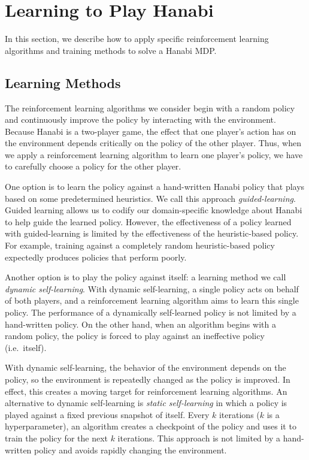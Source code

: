 \section{Learning to Play Hanabi}\label{sec:learninghanabi}

In this section, we describe how to apply specific reinforcement learning
algorithms and training methods to solve a Hanabi MDP.

\subsection{Learning Methods}
The reinforcement learning algorithms we consider begin with a random policy
and continuously improve the policy by interacting with the environment.
Because Hanabi is a two-player game, the effect that one player's action has on
the environment depends critically on the policy of the other player. Thus,
when we apply a reinforcement learning algorithm to learn one player's policy,
we have to carefully choose a policy for the other player.

One option is to learn the policy against a hand-written Hanabi policy that
plays based on some predetermined heuristics. We call this approach
\emph{guided-learning}. Guided learning allows us to codify our domain-specific
knowledge about Hanabi to help guide the learned policy. However, the
effectiveness of a policy learned with guided-learning is limited by the
effectiveness of the heuristic-based policy. For example, training against a
completely random heuristic-based policy expectedly produces policies that
perform poorly.

Another option is to play the policy against itself: a learning method we call
\emph{dynamic self-learning}. With dynamic self-learning, a single policy acts
on behalf of both players, and a reinforcement learning algorithm aims to
learn this single policy. The performance of a dynamically self-learned
policy is not limited by a hand-written policy. On the other hand, when an
algorithm begins with a random policy, the policy is forced to play against an
ineffective policy (i.e.\ itself).

With dynamic self-learning, the behavior of the environment depends on the
policy, so the environment is repeatedly changed as the policy is improved. In
effect, this creates a moving target for reinforcement learning algorithms. An
alternative to dynamic self-learning is \emph{static self-learning} in which a
policy is played against a fixed previous snapshot of itself. Every $k$
iterations ($k$ is a hyperparameter), an algorithm creates a checkpoint of the
policy and uses it to train the policy for the next $k$ iterations. This
approach is not limited by a hand-written policy and avoids rapidly changing
the environment.

